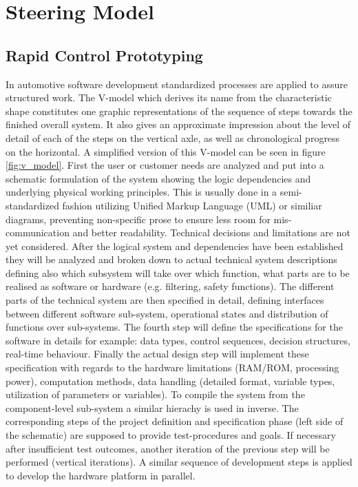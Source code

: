 \documentclass[ExampleMasters.tex]{subfiles}
\begin{document}
\clearpage
\chapter{Steering Model}
\label{chap:steering_model}

\section{Rapid Control Prototyping}
\label{sec:rapid_proto}

In automotive software development standardized processes are applied to assure structured work. The V-model which derives its name from the characteristic shape constitutes one graphic representations of the sequence of steps towards the finished overall system. It also gives an approximate impression about the level of detail of each of the steps on the vertical axle, as well as chronological progress on the horizontal. A simplified version of this V-model can be seen in figure \ref{fig:v_model}. First the user or customer needs are analyzed and put into a schematic formulation of the system showing the logic dependencies and underlying physical working principles. This is usually done in a semi-standardized fashion utilizing Unified Markup Language (UML) or similiar diagrams, preventing non-specific prose to ensure less room for mis-communication and better readability. Technical decisions and limitations are not yet considered. After the logical system and dependencies have been established they will be analyzed and broken down to actual technical system descriptions defining also which subsystem will take over which function, what parts are to be realised as software or hardware (e.g. filtering, safety functions). The different parts of the technical system are then specified in detail, defining interfaces between different software sub-system, operational states and distribution of functions over sub-systems. The fourth step will define the specifications for the software in details for example: data types, control sequences, decision structures, real-time behaviour. Finally the actual design step will implement these specification with regards to the hardware limitations (RAM/ROM, processing power), computation methods, data handling (detailed format, variable types, utilization of parameters or variables). To compile the system from the component-level sub-system a similar hierachy is used in inverse. The corresponding steps of the project definition and specification phase (left side of the schematic) are supposed to provide test-procedures and goals. If necessary after insufficient test outcomes, another iteration of the previous step will be performed (vertical iterations). A similar sequence of development steps is applied to develop the hardware platform in parallel.\cite{automotive_software_engineering}
\end{document}
